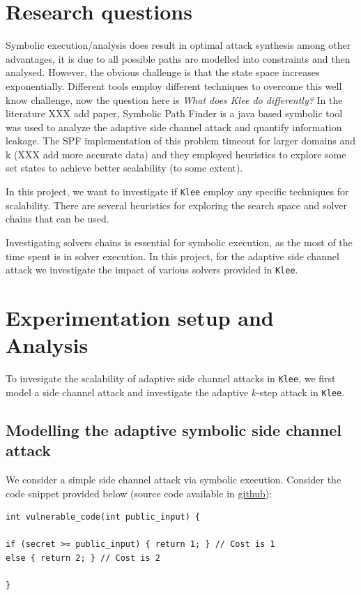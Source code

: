 \documentclass[11pt,a4paper,notitlepage]{article}
\begin{document}
\section{Research questions}
\label{sec:researchquestions}

Symbolic execution/analysis does result in optimal attack synthesis among other advantages, it is due to all possible paths are modelled into constraints and then analysed.
However, the obvious challenge is that the state space increases exponentially.
Different tools employ different techniques to overcome this well know challenge, now the question here is \emph{What does Klee do differently?}
In the literature XXX add paper, Symbolic Path Finder is a java based symbolic tool was used to analyze the adaptive side channel attack and quantify information leakage.
The SPF implementation of this problem timeout for larger domains and k (XXX add more accurate data) and they employed heuristics to explore some set states to achieve better scalability (to some extent).

In this project, we want to investigate if \texttt{Klee} employ any specific techniques for scalability.
There are several heuristics for exploring the search space and solver chains that can be used.

Investigating solvers chains is essential for symbolic execution, as the most of the time spent is in solver execution.
In this project, for the adaptive side channel attack we investigate the impact of various solvers provided in \texttt{Klee}.

\section{Experimentation setup and Analysis}
\label{sec:experimentationanddesign}

To invesigate the scalability of adaptive side channel attacks in \texttt{Klee}, we first model a side channel attack and investigate the adaptive $k$-step attack in \texttt{Klee}.

\subsection{Modelling the adaptive symbolic side channel attack}
\label{subsec:modellingsscattack}

We consider a simple side channel attack via symbolic execution.
Consider the code snippet provided below (source code available in \href{https://github.com/irfansha/LBS_projects.git}{github}):
\begin{verbatim}
int vulnerable_code(int public_input) {

if (secret >= public_input) { return 1; } // Cost is 1
else { return 2; } // Cost is 2

}
\end{verbatim}
\end{document}
